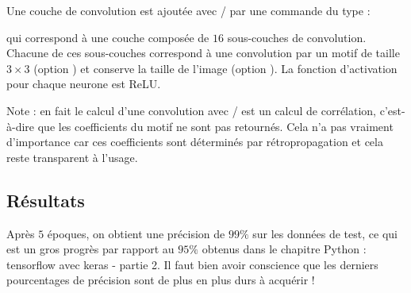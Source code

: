 \documentclass[11pt,class=report,crop=false]{standalone}
\begin{document}
Une couche de convolution est ajoutée avec \tensorflow/\keras{} par une commande du type :

qui correspond à une couche composée de $16$ sous-couches de convolution. 
Chacune de ces sous-couches correspond à une convolution par un motif de taille $3\times 3$ (option ) et conserve la taille de l'image (option ).
La fonction d'activation pour chaque neurone est \og{}ReLU\fg{}.

Note : en fait le calcul d'une \og{}convolution\fg{} avec \tensorflow/\keras{} est un calcul de corrélation, c'est-à-dire que les coefficients du motif ne sont pas retournés. Cela n'a pas vraiment d'importance car ces coefficients sont déterminés par rétropropagation et cela reste transparent à l'usage. 

\subsection{Résultats}

Après $5$ époques, on obtient une précision de $99\%$ sur les données de test, ce qui est un gros progrès par rapport au $95\%$ obtenus dans le chapitre \og{}Python : tensorflow avec keras - partie 2\fg{}. Il faut bien avoir conscience que les derniers pourcentages de précision sont de plus en plus durs à acquérir !
\end{document}
